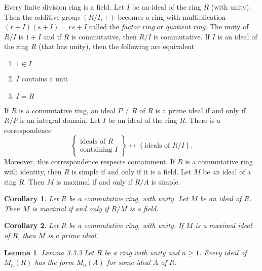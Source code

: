 \documentclass[12pt]{article}
\newtheorem*{lem}{Lemma}
\newenvironment{thm}[1]
{\renewcommand\theinnercustomthm{#1}\innercustomthm}
{\endinnercustomthm}
\newtheorem{cor}{Corollary}[innercustomthm]
\newcommand{\enumarabic}[1]{
	\begin{enumerate}[label=\textbf{\arabic*.}]
		#1
	\end{enumerate}
}
\theoremstyle{definition}
\begin{document}
\begin{thm}{}[Wedderburn's Theorem]
	Every finite division ring is a field.
\end{thm}
\begin{thm}{3.3.1}
	Let $I$ be an ideal of the ring $R$ (with unity).  Then the additive group $(R/I,+)$ becomes a ring with multiplication $(r+I)(s+I)=rs+I$ called the \emph{factor ring} or \emph{quotient ring}.  The unity of $R/I$ is $1+I$ and if $R$ is commutative, then $R/I$ is commutative.
\end{thm}
\begin{thm}{3.3.2}
	If $I$ is an ideal of the ring $R$ (that has unity), then the following are equivalent
	\enumarabic{
		\item $1\in I$
		\item $I$ contains a unit
		\item $I=R$
	}
\end{thm}
\begin{thm}{3.3.3}
	If $R$ is a commutative ring, an ideal $P\neq R$ of $R$ is a prime ideal if and only if $R/P$ is an integral domain.
\end{thm}
\begin{thm}{3.3.4}
	Let $I$ be an ideal of the ring $R$. There is a correspondence
	\[\left\{
	\begin{array}{c}
		\text{ideals of }R\\
		\text{containing }I
	\end{array}
	\right\}\leftrightarrow\left\{
	\text{ideals of }R/I
	\right\}.\]
	Moreover, this correspondence respects containment.
\end{thm}	
\begin{thm}{3.3.5}
	If $R$ is a commutative ring with identity, then $R$ is simple if and only if it is a field.
\end{thm}
\begin{thm}{3.3.6}
	Let $M$ be an ideal of a ring $R$.  Then $M$ is maximal if and only if $R/A$ is simple.
\end{thm}
\begin{cor}
	Let $R$ be a commutative ring, with unity. Let $M$ be an ideal of $R$.  Then $M$ is maximal if and only if $R/M$ is a field.
\end{cor}
\begin{cor}
	Let $R$ be a commutative ring, with unity.  If $M$ is a maximal ideal of $R$, then $M$ is a prime ideal.
\end{cor}
\begin{lem}{Lemma 3.3.3}
	Let $R$ be a ring with unity and $n\geq 1$.  Every ideal of $M_n(R)$ has the form $M_n(A)$ for some ideal $A$ of $R$.
\end{lem}
\end{document}
